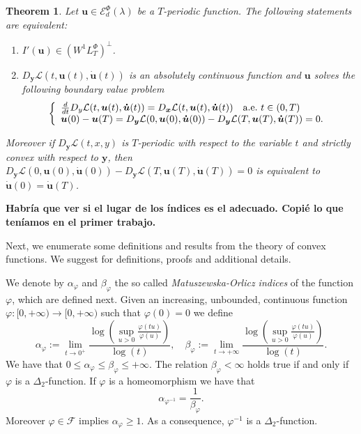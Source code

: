 \documentclass[twoside]{article}
\newtheorem{thm}{Theorem}[section]
\theoremstyle{remark}
\newcommand{\lphi}{L^{\Phi}}
\newcommand{\wphi}{W^{1}\lphi}
\newcommand{\domi}{\mathcal{E}^{\Phi}_d(\lambda)}
\renewcommand{\b}[1]{\boldsymbol{#1}}
\renewcommand{\leq}{\leqslant}
\renewcommand{\geq}{\geqslant}
\begin{document}
\begin{thm}\label{critpoint} Let $\b{u}\in\domi$ be  a $T$-periodic function. The following statements are equivalent:
\begin{enumerate}
 \item $I'(\b{u})\in\left( \wphi_T\right)^{\perp}$.
 \item  $D_{\b{y}}\mathcal{L}(t,\b{u}(t),\b{\dot{u}}(t))$ is an absolutely continuous function and $\b{u}$ solves the following boundary value problem
 \begin{equation}\label{ecualagran2}
    \left\{%
\begin{array}{ll}
   \frac{d}{dt} D_{y}\mathcal{L}(t,\b{u}(t),\b{\dot{u}}(t))= D_{\b{x}}\mathcal{L}(t,\b{u}(t),\b{\dot{u}}(t)) \quad \hbox{a.e.}\ t \in (0,T)\\
    \b{u}(0)-\b{u}(T)=D_{\b{y}}\mathcal{L}(0,\b{u}(0),\b{\dot{u}}(0))-D_{\b{y}}\mathcal{L}(T,\b{u}(T),\b{\dot{u}}(T))=0.
\end{array}%
\right.
\end{equation}
\end{enumerate}
Moreover if $D_{\b{y}}\mathcal{L}(t,x,y)$ is $T$-periodic with respect to the variable $t$ and strictly convex with respect to $\b{y}$, then
$D_{\b{y}}\mathcal{L}(0,\b{u}(0),\b{\b{\dot{\b{u}}}}(0))-D_{\b{y}}\mathcal{L}(T,\b{u}(T),\b{\dot{u}}(T))=0$ is equivalent to $\b{\dot{u}}(0)=\b{\dot{u}}(T)$.
\end{thm}


{\bf Habr\'ia que ver si el lugar de los \'indices es el adecuado. Copi\'e lo que ten\'iamos en el 
primer trabajo.}


Next, we enumerate some definitions and results from the theory of convex functions. 
We suggest \cite{FK97, GP77, KR, M, rao1991theory} for definitions, proofs and additional details.

We denote by $\alpha_{\varphi}$ and $\beta_{\varphi}$ the so called  \emph{Matuszewska-Orlicz indices} of the function $\varphi$, which are defined next. Given
an increasing, unbounded, continuous function  \linebreak $\varphi:[ 0,+\infty)\to [0,+\infty)$ such that $\varphi(0)=0$ we define
\begin{equation}\label{MO_indices}
    \alpha_{\varphi}:=\lim\limits_{t\to 0^{+}}\frac{\log \left (\sup\limits_{u>0}\frac{\varphi(t u)}{\varphi(u)} \right ) }{\log(t)},\quad
    \beta_{\varphi}:=\lim\limits_{t\to +\infty}\frac{\log \left  (\sup\limits_{u>0}\frac{\varphi(t u)}{\varphi(u)}\right )}{\log(t)}.
\end{equation}
We have that $0\leq \alpha_{\varphi}\leq \beta_{\varphi}\leq +\infty$. The relation $\beta_{\varphi}<\infty$ holds true if and only if $\varphi$ is a
$\Delta_2$-function. If $\varphi$ is a homeomorphism  we have that
\begin{equation}\label{inv_indices}
    \alpha_{\varphi^{-1}}=\frac{1}{\beta_{\varphi}}.
\end{equation}
Moreover $\varphi\in\mathcal{F}$ implies  $\alpha_{\varphi}\geq 1$. As a consequence, $\varphi^{-1}$ is a $\Delta_2$-function.
\end{document}
